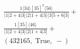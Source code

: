 \documentclass[varwidth, border=5pt]{standalone}
\begin{document}
\begin{my}
$\begin{gathered}
\scriptscriptstyle\frac{1⟨34⟩[35]^2⟨56⟩}{⟨1|2+4|3]⟨2|1+4|3]⟨3|5+6|3]}+\\
\scriptscriptstyle\frac{1[35]⟨46⟩}{⟨1|2+4|3]⟨2|1+4|3]}+\\
\scriptscriptstyle(432165,\;\text{True},\;-)\phantom{+}
\end{gathered}$
\end{my}
\end{document}
